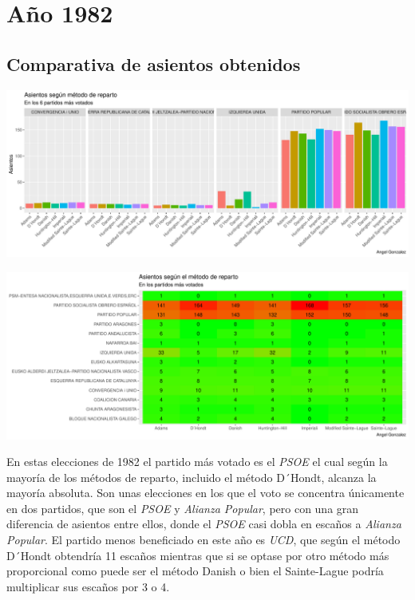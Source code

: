 \documentclass[12pt,a4paper,]{book}
\numberwithin{dummy}{section}
\theoremstyle{ocrenumbox}
\theoremstyle{blacknumex}
\theoremstyle{blacknumbox}
\theoremstyle{ocrenum}
\theoremstyle{ocrenum}
\begin{document}
\hypertarget{auxf1o-1982}{%
\section{Año 1982}\label{auxf1o-1982}}

\hypertarget{comparativa-de-asientos-obtenidos-2}{%
\subsection{Comparativa de asientos
obtenidos}\label{comparativa-de-asientos-obtenidos-2}}

\begin{center}\includegraphics[width=1\linewidth]{figurasR/unnamed-chunk-82-1} \end{center}

\begin{center}\includegraphics[width=1\linewidth]{figurasR/unnamed-chunk-82-2} \end{center}

En estas elecciones de 1982 el partido más votado es el \emph{PSOE} el
cual según la mayoría de los métodos de reparto, incluido el método
D´Hondt, alcanza la mayoría absoluta. Son unas elecciones en los que el
voto se concentra únicamente en dos partidos, que son el \emph{PSOE} y
\emph{Alianza Popular}, pero con una gran diferencia de asientos entre
ellos, donde el \emph{PSOE} casi dobla en escaños a \emph{Alianza
Popular}. El partido menos beneficiado en este año es \emph{UCD}, que
según el método D´Hondt obtendría 11 escaños mientras que si se optase
por otro método más proporcional como puede ser el método Danish o bien
el Sainte-Lague podría multiplicar sus escaños por 3 o 4.
\end{document}

